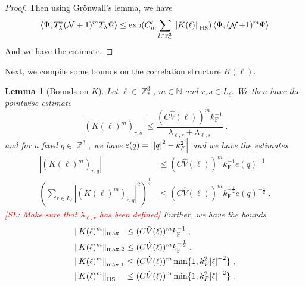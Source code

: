 \documentclass[sn-mathphys, Numbered ,a4paper]{sn-jnl}%
\DeclareMathOperator{\Z}{\mathbb{Z}}
\DeclareMathOperator{\NN}{\mathcal{N}}
\newcommand{\half}{\frac{1}{2}}
\newcommand{\eva}[1]{\left\langle #1 \right\rangle}
\newcommand{\F}{\mathrm{F}}
\newcommand{\normmaxi}[1]{\norm{#1}_{\mathrm{max,1}}}
\theoremstyle{plain}
\newtheorem{lemma}[theorem]{Lemma}
\theoremstyle{definition}
\theoremstyle{remark}
\theoremstyle{plain}
\theoremstyle{definition}
\theoremstyle{remark}
\begin{document}
\begin{proof}
\begin{comment}
        &\leq 4 \sum\limits_{\ell \in \Z^3_*} \norm{K(\ell)}_{\mathrm{HS}} \eva{\Psi,T^*_\lambda(\NN+1)T_\lambda\Psi}
    \end{align}
\end{comment}
    Then using Gr\"onwall's lemma, we have
    \begin{equation}
        \eva{\Psi, T^*_{\lambda}(\mathcal{N} +1)^m T_{\lambda} \Psi } \leq \mathrm{exp}(C'_m\sum\limits_{l\in \Z^3_*} \norm{K(\ell)}_{\mathrm{HS}}) \eva{\Psi, (\NN+1)^m\Psi}
    \end{equation}
    And we have the estimate.
\end{proof}

Next, we compile some bounds on the correlation structure $ K(\ell) $.
\begin{lemma}[Bounds on $ K $]\label{lem:normsk}
	Let $ \ell \in \Z^3_* $, $ m \in \mathbb{N} $ and $ r,s \in L_\ell $. We then have the pointwise estimate
	\begin{equation} \label{eq:K_element_bounds}
		|(K(\ell)^m)_{r,s}|
		\le \frac{(C \hat{V}(\ell))^m k_{\F}^{-1}}{\lambda_{\ell,r} + \lambda_{\ell,s}} \;.
	\end{equation}
and for a fixed $q \in \Z^3$, we have $e(q) = \abs{\abs{q}^2-k_F^2}$ and we have the estimates
\begin{equation}\label{eq:Kq_element_bounds}
\begin{aligned}
	|(K(\ell)^m)_{r,q}|
	&\le(C \hat{V}(\ell))^m k_{\F}^{-1} e(q)^{-1} \\
	 \left(\sum\limits_{r \in L_{\ell}}	|(K(\ell)^m)_{r,q}|^2\right)^{\half}
	&\le (C \hat{V}(\ell))^m  k_{\F}^{-\half} e(q)^{-\half} \;.
\end{aligned}
\end{equation}
\textcolor{red}{[SL: Make sure that $ \lambda_{\ell,r} $ has been defined]} Further, we have the bounds
\begin{equation} \label{eq:K_max_bounds}
\begin{aligned}
	&\Vert K(\ell)^m \Vert_{\mathrm{max}}\!\!\!\!
	&\le\; &(C \hat{V}(\ell))^m k_{\F}^{-1} \;, \\ 
	&\Vert K(\ell)^m \Vert_{\mathrm{max},2}\!\!\!\!
	&\le \;&(C \hat{V}(\ell))^m k_{\F}^{-\frac 12} \;, \\
	&\normmaxi{K(\ell)^m}\!\!\!\!
	&\leq \; &(C \hat{V}(\ell))^m \min\{1,k^2_F\abs{\ell}^{-2}\} \;,\\
	&\norm{K(\ell)^m}_{\mathrm{HS}}\!\!\!\!
	&\le \;&(C \hat{V}(\ell))^m \min\{1,k^2_F\abs{\ell}^{-2}\} \;.
\end{aligned}   
\end{equation}
\end{lemma}
\end{document}
